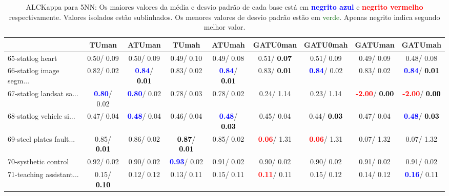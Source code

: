 \begin{table}[h]
\caption{ALCKappa para 5NN: Os maiores valores da média e desvio padrão de cada base está em \textcolor{blue}{\textbf{negrito azul}} e \textcolor{red}{\textbf{negrito vermelho}} respectivamente. Valores isolados estão sublinhados. Os menores valores de desvio padrão estão em \textcolor{darkgreen}{verde}. Apenas negrito indica segundo melhor valor.}
\begin{center}\begin{tabular}{lc|c|c|c|c|c|c|c}
 & TUman & \textbf{ATUman} & TUmah & \textbf{ATUmah} & GATU0man & GATU0mah & GATUman & GATUmah\\ \hline 65-statlog heart &   0.50/  0.09 &   0.50/  0.09 &   0.49/  0.10 &   0.49/  0.08 &   0.51/\textcolor{black}{\textbf{  0.07}} &   0.51/  0.09 &   0.49/  0.09 &   0.48/  0.08 \\
66-statlog image segm... &   0.82/  0.02 & \textcolor{blue}{\textbf{  0.84}}/\textcolor{black}{\textbf{  0.01}} &   0.83/  0.02 & \textcolor{blue}{\textbf{  0.84}}/\textcolor{black}{\textbf{  0.01}} &   0.83/\textcolor{black}{\textbf{  0.01}} & \textcolor{blue}{\textbf{  0.84}}/  0.02 &   0.83/  0.02 & \textcolor{blue}{\textbf{  0.84}}/\textcolor{black}{\textbf{  0.01}} \\
67-statlog landsat sa... & \textcolor{blue}{\textbf{  0.80}}/  0.02 & \textcolor{blue}{\textbf{  0.80}}/  0.02 &   0.78/  0.03 &   0.78/  0.02 &   0.24/  1.14 &   0.23/  1.14 & \textcolor{red}{\textbf{ -2.00}}/\textcolor{black}{\textbf{  0.00}} & \textcolor{red}{\textbf{ -2.00}}/\textcolor{black}{\textbf{  0.00}} \\
68-statlog vehicle si... &   0.47/  0.04 & \textcolor{blue}{\textbf{  0.48}}/  0.04 &   0.46/  0.04 & \textcolor{blue}{\textbf{  0.48}}/\textcolor{black}{\textbf{  0.03}} &   0.45/  0.04 &   0.44/\textcolor{black}{\textbf{  0.03}} &   0.47/  0.04 & \textcolor{blue}{\textbf{  0.48}}/\textcolor{black}{\textbf{  0.03}} \\
69-steel plates fault... &   0.85/\textcolor{black}{\textbf{  0.01}} &   0.86/  0.02 & \textcolor{black}{\textbf{  0.87}}/\textcolor{black}{\textbf{  0.01}} &   0.85/  0.02 & \textcolor{red}{\textbf{  0.06}}/  1.31 & \textcolor{red}{\textbf{  0.06}}/  1.31 &   0.07/  1.32 &   0.07/  1.32 \\
70-systhetic control &   0.92/  0.02 &   0.90/  0.02 & \textcolor{blue}{\textbf{  0.93}}/  0.02 &   0.91/  0.02 &   0.90/  0.02 &   0.90/  0.02 &   0.91/  0.02 &   0.91/  0.02 \\
71-teaching assistant... &   0.15/\textcolor{black}{\textbf{  0.10}} &   0.12/  0.12 &   0.13/  0.11 &   0.15/  0.11 & \textcolor{red}{\textbf{  0.11}}/  0.11 &   0.15/  0.12 &   0.14/  0.12 & \textcolor{blue}{\textbf{  0.16}}/  0.11 \\ \hline

\end{tabular}
\end{center}
\end{table}
